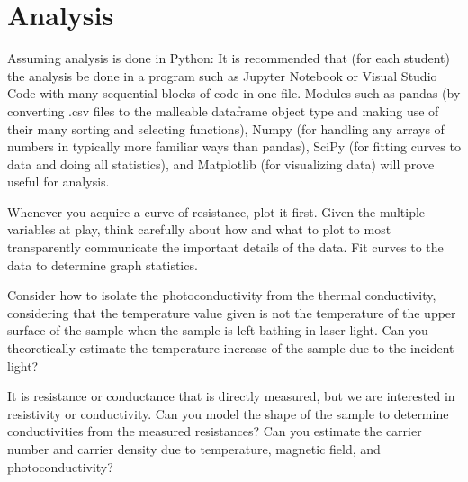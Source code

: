 \documentclass{article}
\begin{document}
\section*{Analysis}

Assuming analysis is done in Python: It is recommended that (for each student) the analysis be done in a program such as Jupyter Notebook or Visual Studio Code with many sequential blocks of code in one file. Modules such as pandas (by converting .csv files to the malleable dataframe object type and making use of their many sorting and selecting functions), Numpy (for handling any arrays of numbers in typically more familiar ways than pandas), SciPy (for fitting curves to data and doing all statistics), and Matplotlib (for visualizing data) will prove useful for analysis.

Whenever you acquire a curve of resistance, plot it first. Given the multiple variables at play, think carefully about how and what to plot to most transparently communicate the important details of the data. Fit curves to the data to determine graph statistics.

Consider how to isolate the photoconductivity from the thermal conductivity, considering that the temperature value given is not the temperature of the upper surface of the sample when the sample is left bathing in laser light. Can you theoretically estimate the temperature increase of the sample due to the incident light?

It is resistance or conductance that is directly measured, but we are interested in resistivity or conductivity. Can you model the shape of the sample to determine conductivities from the measured resistances? Can you estimate the carrier number and carrier density due to temperature, magnetic field, and photoconductivity?
\end{document}
